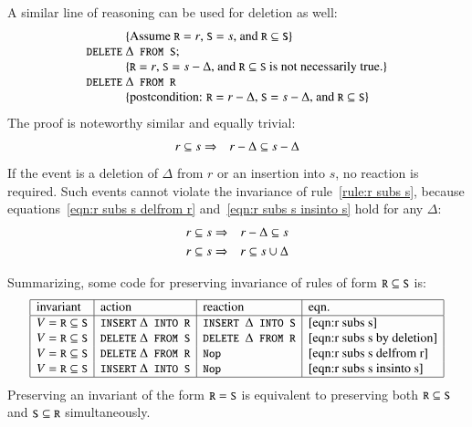 \documentclass{elsarticle}
\begin{document}
	A similar line of reasoning can be used for deletion as well:
\[\begin{array}{r@{~}l}
&\{\text{Assume $\code{R}=r$, $\code{S}=s$, and $\code{R}\subs\code{S}$}\}\\
\code{DELETE}&\Delta\code{ FROM S};\\
&\{\text{$\code{R}=r$, $\code{S}=s-\Delta$, and $\code{R}\subs\code{S}$ is not necessarily true.}\}\\
\code{DELETE}&\Delta\code{ FROM R}\\
&\{\text{postcondition: $\code{R}=r-\Delta$, $\code{S}=s-\Delta$, and $\code{R}\subs\code{S}$}\}
\end{array}\]
	The proof is noteworthy similar and equally trivial:
\begin{eqnarray}
r\subseteq s&\Rightarrow&r-\Delta\subseteq s-\Delta\label{eqn:r subs s by deletion}
\end{eqnarray}
	If the event is a deletion of $\Delta$ from $r$ or an insertion into $s$, no reaction is required.
	Such events cannot violate the invariance of rule~\ref{rule:r subs s},
	because equations~\ref{eqn:r subs s delfrom r} and~\ref{eqn:r subs s insinto s} hold for any $\Delta$:
\begin{eqnarray}
r\subseteq s&\Rightarrow&r-\Delta\subseteq s\label{eqn:r subs s delfrom r}\\
r\subseteq s&\Rightarrow&r\subseteq s\cup\Delta\label{eqn:r subs s insinto s}
\end{eqnarray}

Summarizing, some code for preserving invariance of rules of form $\text{\tt\small R}\subseteq\text{\tt\small S}$ is:
\[\begin{array}{|l|l|l|l|}
\hline
\text{invariant}&\text{action}&\text{reaction}&\text{eqn.}\\ \hline
\full=\code{R}\subs\code{S}&\code{INSERT}\ \Delta\code{ INTO R}&\code{INSERT }\Delta\code{ INTO S}&\ref{eqn:r subs s}\\
\full=\code{R}\subs\code{S}&\code{DELETE}\ \Delta\code{ FROM S}&\code{DELETE }\Delta\code{ FROM R}&\ref{eqn:r subs s by deletion}\\
\full=\code{R}\subs\code{S}&\code{DELETE}\ \Delta\code{ FROM R}&\code{Nop}&\ref{eqn:r subs s delfrom r}\\
\full=\code{R}\subs\code{S}&\code{INSERT}\ \Delta\code{ INTO S}&\code{Nop}&\ref{eqn:r subs s insinto s}\\ \hline
\end{array}\]
Preserving an invariant of the form $\text{\tt\small R}=\text{\tt\small S}$ is equivalent to preserving both $\text{\tt\small R}\subseteq\text{\tt\small S}$ and $\text{\tt\small S}\subseteq\text{\tt\small R}$ simultaneously.
\end{document}
